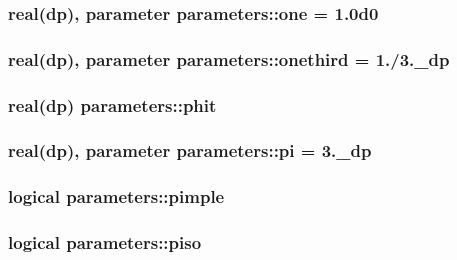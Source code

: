 \hypertarget{classparameters_ad200e8f8acd12afc12f7b019a982db1c}{
\subsubsection[{one}]{\setlength{\rightskip}{0pt plus 5cm}real(dp), parameter parameters\-::one = 1.\-0d0}}\label{classparameters_ad200e8f8acd12afc12f7b019a982db1c}
\hypertarget{classparameters_aecae38d60a3a6300c7c9a09310d8e505}{
\subsubsection[{onethird}]{\setlength{\rightskip}{0pt plus 5cm}real(dp), parameter parameters\-::onethird = 1./3.\-\_\-dp}}\label{classparameters_aecae38d60a3a6300c7c9a09310d8e505}
\hypertarget{classparameters_ab8f16b748cf7066342e3c51ec143c6df}{
\subsubsection[{phit}]{\setlength{\rightskip}{0pt plus 5cm}real(dp) parameters\-::phit}}\label{classparameters_ab8f16b748cf7066342e3c51ec143c6df}
\hypertarget{classparameters_aa08e5ec8fb6453fc72c9291a5a8b73fd}{
\subsubsection[{pi}]{\setlength{\rightskip}{0pt plus 5cm}real(dp), parameter parameters\-::pi = 3.\-\_\-dp}}\label{classparameters_aa08e5ec8fb6453fc72c9291a5a8b73fd}
\hypertarget{classparameters_a06a69513ef60e051130cbe69d2f71e09}{
\subsubsection[{pimple}]{\setlength{\rightskip}{0pt plus 5cm}logical parameters\-::pimple}}\label{classparameters_a06a69513ef60e051130cbe69d2f71e09}
\hypertarget{classparameters_a6e3814526eb5d4688e786b776e333c68}{
\subsubsection[{piso}]{\setlength{\rightskip}{0pt plus 5cm}logical parameters\-::piso}}\label{classparameters_a6e3814526eb5d4688e786b776e333c68}
